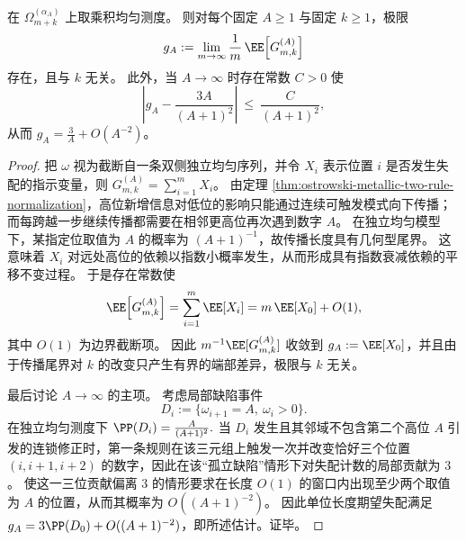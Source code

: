 \begin{theorem}[金属平均截断规范差的极限与步长不变性]\label{thm:ostrowski-metallic-truncation-mismatch-limit}
在 \(\Omega_{m+k}^{(\alpha_A)}\) 上取乘积均匀测度。
则对每个固定 \(A\ge 1\) 与固定 \(k\ge 1\)，极限
\[
g_A:=\lim_{m\to\infty}\frac{1}{m}\,\EE\!\left[G^{(A)}_{m,k}\right]
\]
存在，且与 \(k\) 无关。
此外，当 \(A\to\infty\) 时存在常数 \(C>0\) 使
\[
\left|g_A-\frac{3A}{(A+1)^2}\right|\ \le\ \frac{C}{(A+1)^2},
\]
从而
\(
g_A=\frac{3}{A}+O(A^{-2})
\)。
\end{theorem}
\begin{proof}
把 \(\omega\) 视为截断自一条双侧独立均匀序列，并令 \(X_i\) 表示位置 \(i\) 是否发生失配的指示变量，则
\(
G^{(A)}_{m,k}=\sum_{i=1}^m X_i
\)。
由定理 \ref{thm:ostrowski-metallic-two-rule-normalization}，高位新增信息对低位的影响只能通过连续可触发模式向下传播；而每跨越一步继续传播都需要在相邻更高位再次遇到数字 \(A\)。
在独立均匀模型下，某指定位取值为 \(A\) 的概率为 \((A+1)^{-1}\)，故传播长度具有几何型尾界。
这意味着 \(X_i\) 对远处高位的依赖以指数小概率发生，从而形成具有指数衰减依赖的平移不变过程。
于是存在常数使
\[
\EE\!\left[G^{(A)}_{m,k}\right]=\sum_{i=1}^m \EE[X_i]=m\,\EE[X_0]+O(1),
\]
其中 \(O(1)\) 为边界截断项。
因此 \(m^{-1}\EE[G^{(A)}_{m,k}]\) 收敛到 \(g_A:=\EE[X_0]\)，并且由于传播尾界对 \(k\) 的改变只产生有界的端部差异，极限与 \(k\) 无关。
\par
最后讨论 \(A\to\infty\) 的主项。
考虑局部缺陷事件
\[
D_i:=\{\omega_{i+1}=A,\ \omega_i>0\}.
\]
在独立均匀测度下
\(
\PP(D_i)=\frac{A}{(A+1)^2}.
\)
当 \(D_i\) 发生且其邻域不包含第二个高位 \(A\) 引发的连锁修正时，第一条规则在该三元组上触发一次并改变恰好三个位置 \((i,i+1,i+2)\) 的数字，因此在该“孤立缺陷”情形下对失配计数的局部贡献为 \(3\)。
使这一三位贡献偏离 \(3\) 的情形要求在长度 \(O(1)\) 的窗口内出现至少两个取值为 \(A\) 的位置，从而其概率为 \(O((A+1)^{-2})\)。
因此单位长度期望失配满足
\(
g_A=3\PP(D_0)+O((A+1)^{-2})
\)，即所述估计。证毕。
\end{proof}

